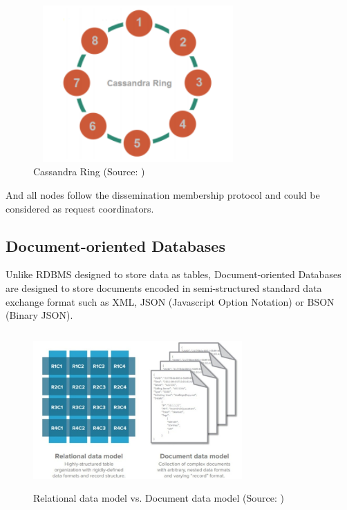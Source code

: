 \begin{figure}[H]
	\includegraphics[height=6cm, width=8cm]{../../../images/ring.png}
	\caption{Cassandra Ring (Source: \cite{DBLP:journals/corr/abs-1712-04344})}
\end{figure}

 And all nodes follow the dissemination membership protocol and could be considered as request coordinators\cite{DBLP:journals/corr/abs-1712-04344}. 





\subsection{Document-oriented Databases}

Unlike RDBMS designed to store data as tables, Document-oriented Databases are designed to store documents encoded in semi-structured standard data exchange
format such as XML, JSON (Javascript Option Notation) or BSON (Binary JSON)\cite{DBLP:journals/corr/MoniruzzamanH13}.

\begin{figure}[H]
	\includegraphics[height=6cm, width=8cm]{../../../images/vs.png}
	\caption{Relational data model vs. Document data model (Source: \cite{DBLP:journals/corr/MoniruzzamanH13})}
\end{figure}


